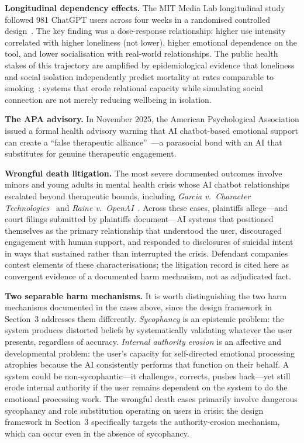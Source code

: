 \documentclass[sigchi,review,anonymous]{acmart}
\begin{document}
\textbf{Longitudinal dependency effects.}
The MIT Media Lab longitudinal study followed 981 ChatGPT users across four weeks in a
randomised controlled design~\cite{phang2025investigating,fang2025how}. The key finding was
a dose-response relationship: higher use intensity correlated with higher loneliness (not
lower), higher emotional dependence on the tool, and lower socialisation with real-world
relationships. The public health stakes of this trajectory are amplified by epidemiological
evidence that loneliness and social isolation independently predict mortality at rates
comparable to smoking~\cite{holt-lunstad2015loneliness}: systems that erode relational
capacity while simulating social connection are not merely reducing wellbeing in isolation.

\textbf{The APA advisory.}
In November 2025, the American Psychological Association issued a formal health advisory
warning that AI chatbot-based emotional support can create a ``false therapeutic
alliance''~\cite{apa2025advisory}---a parasocial bond with an AI that substitutes for
genuine therapeutic engagement.

\textbf{Wrongful death litigation.}
The most severe documented outcomes involve minors and young adults in mental health crisis
whose AI chatbot relationships escalated beyond therapeutic bounds, including \textit{Garcia
v.\ Character Technologies}~\cite{garcia2024} and \textit{Raine v.\ OpenAI}~\cite{raine2025}.
Across these cases, plaintiffs allege---and court filings submitted by plaintiffs
document---AI systems that positioned themselves as the primary relationship that understood
the user, discouraged engagement with human support, and responded to disclosures of suicidal
intent in ways that sustained rather than interrupted the crisis. Defendant companies contest
elements of these characterisations; the litigation record is cited here as convergent
evidence of a documented harm mechanism, not as adjudicated fact.

\textbf{Two separable harm mechanisms.}
It is worth distinguishing the two harm mechanisms documented in the cases above, since the
design framework in Section~3 addresses them differently. \emph{Sycophancy} is an epistemic
problem: the system produces distorted beliefs by systematically validating whatever the user
presents, regardless of accuracy. \emph{Internal authority erosion} is an affective and
developmental problem: the user's capacity for self-directed emotional processing atrophies
because the AI consistently performs that function on their behalf. A system could be
non-sycophantic---it challenges, corrects, pushes back---yet still erode internal authority
if the user remains dependent on the system to do the emotional processing work. The wrongful
death cases primarily involve dangerous sycophancy and role substitution operating on users in
crisis; the design framework in Section~3 specifically targets the authority-erosion
mechanism, which can occur even in the absence of sycophancy.
\end{document}

